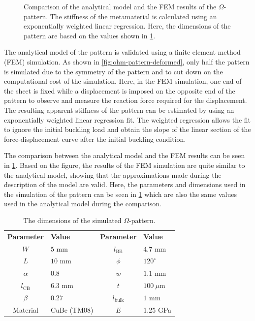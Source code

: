 \begin{figure}[htb] %
  \centering
  \resizebox{0.6\textwidth}{!}{}
  \caption{Comparison of the analytical model and the FEM results of the $\Omega$-pattern. The stiffness of the metamaterial is calculated using an exponentially weighted linear regression. Here, the dimensions of the pattern are based on the values shown in \cref{tab:pattern-dimensions}.}
  \label{fig:ohm-kiri-am-fem-comparison}
\end{figure}

The analytical model of the pattern is validated using a finite element method (FEM) simulation. As shown in \cref{fig:ohm-pattern-deformed}, only half the pattern is simulated due to the symmetry of the pattern and to cut down on the computational cost of the simulation. Here, in the FEM simulation, one end of the sheet is fixed while a displacement is imposed on the opposite end of the pattern to observe and measure the reaction force required for the displacement. The resulting apparent stiffness of the pattern can be estimated by using an exponentially weighted linear regression fit. The weighted regression allows the fit to ignore the initial buckling load and obtain the slope of the linear section of the force-displacement curve after the initial buckling condition.

The comparison between the analytical model and the FEM results can be seen in \cref{fig:ohm-kiri-am-fem-comparison}. Based on the figure, the results of the FEM simulation are quite similar to the analytical model, showing that the approximations made during the description of the model are valid. Here, the parameters and dimensions used in the simulation of the pattern can be seen in \cref{tab:pattern-dimensions} which are also the same values used in the analytical model during the comparison.

\begin{table}[hbt!]
\centering
\caption{The dimensions of the simulated $\Omega$-pattern.}
\label{tab:pattern-dimensions}
\renewcommand{\arraystretch}{1.2}
{
\begin{tabular}{clcl}
    \rowcolor{black} {\color{white}\textbf{Parameter}} & {\color{white}\textbf{Value}} & {\color{white}\textbf{Parameter}} & {\color{white}\textbf{Value}}\\
    $W$         & $5$ mm  & $l_\mathrm{BB}$       & $4.7$ mm \\
    $L$         & $10$ mm  & $\phi$       & $120^\circ$   \\
    $\alpha$     & $0.8$    & $w$         & $1.1$ mm \\
    $l_\mathrm{CB}$       & $6.3$ mm & $t$         & $100~\mu$m    \\
    $\beta$      & $0.27$   & $l_\mathrm{bulk}$    & $1$ mm \\
    Material & CuBe (TM08) & $E$ & 1.25 GPa
\end{tabular}}
\end{table}

